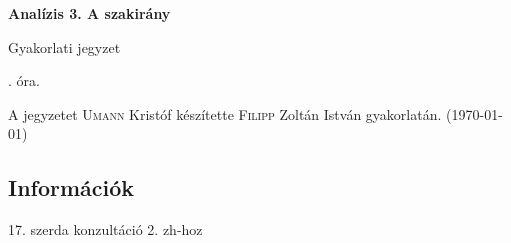 \documentclass[a4paper,11.5pt]{article}
\begin{document}
	\setlength\parindent{0pt}
	\def\a{\textbf{a}}
	\def\b{\textbf{b}}
	\def\N{\hskip 10 true mm}
	\def\a{\textbf{a}}
	\def\b{\textbf{b}}
	\def\c{\textbf{c}}
	\def\d{\textbf{d}}
	\def\e{\textbf{e}}
	\def\gg{$\gamma$}
	\def\vi{\textbf{i}}
	\def\jj{\textbf{j}}
	\def\kk{\textbf{k}}
	\def\fh{\overrightarrow}
	\def\l{\lambda}
	\def\m{\mu}
	\def\v{\textbf{v}}
	\def\0{\textbf{0}}
	\def\s{\hspace{0.2mm}\vphantom{\beta}}
	\def\Z{\mathbb{Z}}
	\def\Q{\mathbb{Q}}
	\def\R{\mathbb{R}}
	\def\C{\mathbb{C}}
	\def\N{\mathbb{N}}
	\def\Rn{\mathbb{R}^{n}}
	\def\Ra{\overline{\mathbb{R}}}
	\def\sume{\displaystyle\sum_{n=1}^{+\infty}}
	\def\sumn{\displaystyle\sum_{n=0}^{+\infty}}
	\def\biz{\emph{Bizonyítás:\ }}
	\def\narrow{\underset{n\rightarrow+\infty}{\longrightarrow}}
	\def\limn{\displaystyle\lim_{n\to +\infty}}
	
	\theoremstyle{definition}
	\newtheorem{theorem}{Tétel}[subsubsection] %
	
	\theoremstyle{definition}
	\newtheorem{definition}[theorem]{Definíció} %
	\newtheorem{example}[theorem]{Példa} %
	\newtheorem{exercise}[theorem]{Házi feladat} %
	\newtheorem{note}[theorem]{Megjegyzés} %
	\newtheorem{task}[theorem]{Feladat} %
	\newtheorem{revision}[theorem]{Emlékeztető} %
	\begin{center}
		{\LARGE\textbf{Analízis 3. A szakirány}}
		\smallskip
		
		{\Large Gyakorlati jegyzet}
		
		. óra.
	\end{center}
	A jegyzetet \textsc{Umann} Kristóf készítette \textsc{Filipp} Zoltán István gyakorlatán. (\today)
	\subsection{Információk}
	17. szerda konzultáció 2. zh-hoz
\end{document}
